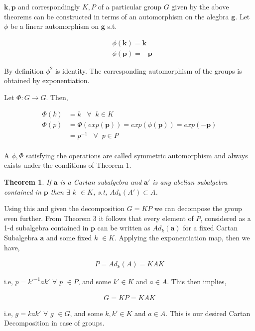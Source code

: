 \documentclass{amsart}
\newtheorem{thm}[]{Theorem}
\begin{document}
$\mathbf{k},\mathbf{p}$ and correspondingly $K,P$ of a particular group $G$ given by the above theorems can be constructed in terms of an automorphism on the alegbra $\mathbf{g}$. Let $\phi$ be a linear automorphism on $\mathbf{g}$ s.t.

\begin{align*}
    &\phi(\mathbf{k})=\mathbf{k}
    \\ &\phi(\mathbf{p})= -\mathbf{p}
\end{align*}

By definition $\phi^2$ is identity. The corresponding automorphism of the groups is obtained by exponentiation.

Let $\Phi: G \rightarrow G$. Then,  

\begin{align*}
    \Phi(k) & = k \;\;\;\forall \;\;k \in K\\
    \Phi(p) & = \Phi(exp(\mathbf{p}))=exp(\phi(\mathbf{p}))=exp(-\mathbf{p}) \\
    & = p^{-1} \;\;\;\forall \;\;p \in P\\
\end{align*}

A $\phi, \Phi$ satisfying the operations are called symmetric automorphism and always exists under the conditions of Theorem 1.

\begin{thm}
If $\mathbf{a}$ is a Cartan subalgebra and $\mathbf{a'}$ is any abelian subalgebra contained in $\mathbf{p}$ then $\exists$ $k$ $\in K$, s.t, $Ad_k(A')\subset A$.
\end{thm}

Using this and given the decomposition $G=KP$ we can decompose the group even further. From Theorem 3 it follows that every element of $P$, considered as a 1-d subalgebra contained in $\mathbf{p}$ can be written as $Ad_k(\mathbf{a})$ for a fixed Cartan Subalgebra $\mathbf{a}$ and some fixed $k$ $\in K$. Applying the exponentiation map, then we have,

\begin{align*}
    P= Ad_k(A) = KAK
\end{align*}

i.e, $p=k'^{-1}ak'$ $\forall$ $p$ $\in P$, and some $k'\in K$ and $a \in A$. This then implies,

\begin{align*}
    G= KP = KAK
\end{align*}

i.e, $g=kak'$ $\forall$ $g$ $\in G$, and some $k,k'\in K$ and $a \in A$. This is our desired Cartan Decomposition in case of groups.
\end{document}
